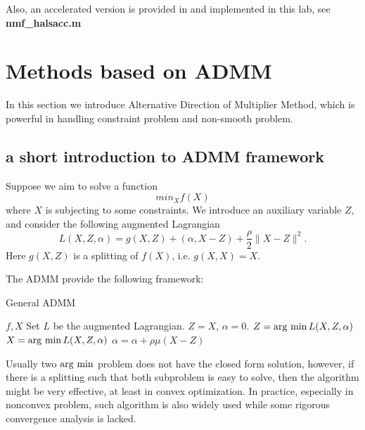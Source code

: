 \documentclass{article}
\begin{document}
Also, an accelerated version is provided in \cite{muacc} and implemented in this lab, see \textbf{nmf\_halsacc.m}
\iffalse
\section{Methods based on ANLS}

\subsection{Block Pivoting}

\subsection{Active Set}

\subsection{Grouped Active Set}
\fi
\section{Methods based on ADMM}
In this section we introduce Alternative Direction of Multiplier Method, which is powerful in handling constraint problem and non-smooth problem.
\subsection{a short introduction to ADMM framework}
Suppose we aim to solve a function 
$$min_X f(X)$$
where $X$ is subjecting to some constraints. We introduce an auxiliary variable $Z$, and consider the following augmented Lagrangian
$$L(X,Z,\alpha) = g(X,Z) + (\alpha, X-Z) + \frac{\rho}{2} \|X-Z\|^2.$$
Here $g(X,Z)$ is a splitting of $f(X)$, i.e. $g(X,X) = X$.

The ADMM provide the following framework:
\begin{algorithm}
	\caption{General ADMM}
	\begin{algorithmic}[1]
	\REQUIRE $f, X$
	\STATE Set $L$ be the augmented Lagrangian.
	\STATE $Z = X$, $\alpha = 0$.
	\STATE $Z = \operatorname{arg~min} L(X,Z,\alpha)$
	\STATE $X = \operatorname{arg~min} L(X,Z,\alpha)$
	\STATE $\alpha = \alpha + \rho\mu(X-Z)$
	\ENDWHILE
	\end{algorithmic}
\end{algorithm}
Usually two $\operatorname{arg~min}$ problem does not have the closed form solution, however, if there is a splitting such that both subproblem is easy to solve, then the algorithm might be very effective, at least in convex optimization. In practice, especially in nonconvex problem, such algorithm is also widely used while some rigorous convergence analysis is lacked.
\end{document}
